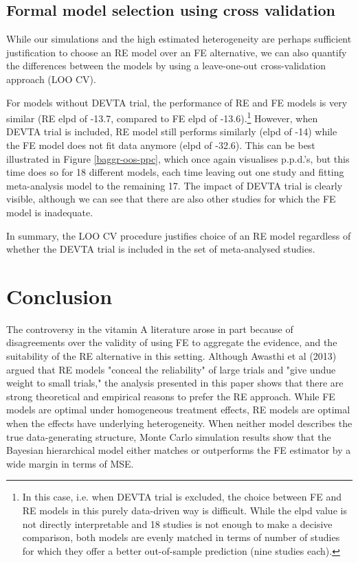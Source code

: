 \documentclass[12pt]{article}
\begin{document}
\subsection{Formal model selection using cross validation}

While our simulations and the high estimated heterogeneity are perhaps sufficient justification to choose an RE model over an FE alternative, we can also quantify the differences between the models by using a leave-one-out cross-validation approach (LOO CV).

For models without DEVTA trial, the performance of RE and FE models is very similar (RE elpd of -13.7, compared to FE elpd of -13.6).\footnote{In this case, i.e. when DEVTA trial is excluded, the choice between FE and RE models in this purely data-driven way is difficult. While the elpd value is not directly interpretable and 18 studies is not enough to make a decisive comparison, both models are evenly matched in terms of number of studies for which they offer a better out-of-sample prediction (nine studies each).} However, when DEVTA trial is included, RE model still performs similarly (elpd of -14) while the FE model does not fit data anymore (elpd of -32.6). This can be best illustrated in Figure \ref{baggr-oos-ppc}, which once again visualises p.p.d.'s, but this time does so for 18 different models, each time leaving out one study and fitting meta-analysis model to the remaining 17. The impact of DEVTA trial is clearly visible, although we can see that there are also other studies for which the FE model is inadequate.

In summary, the LOO CV procedure justifies choice of an RE model regardless of whether the DEVTA trial is included in the set of meta-analysed studies.




\section{Conclusion}

The controversy in the vitamin A literature arose in part because of disagreements over the validity of using FE to aggregate the evidence, and the suitability of the RE alternative in this setting. Although Awasthi et al (2013) argued that RE models "conceal the reliability" of large trials and "give undue weight to small trials," the analysis presented in this paper shows that there are strong theoretical and empirical reasons to prefer the RE approach. While FE models are optimal under homogeneous treatment effects, RE models are optimal when the effects have underlying heterogeneity. When neither model describes the true data-generating structure, Monte Carlo simulation results show that the Bayesian hierarchical model either matches or outperforms the FE estimator by a wide margin in terms of MSE.
\end{document}
